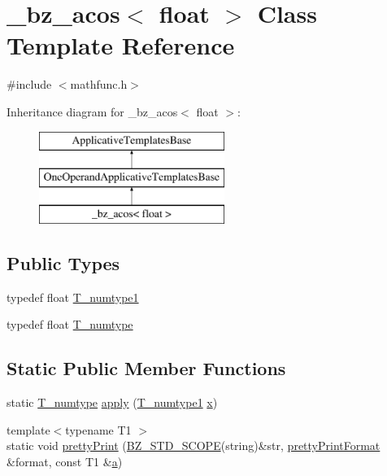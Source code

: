 \hypertarget{class__bz__acos_3_01float_01_4}{}\section{\+\_\+bz\+\_\+acos$<$ float $>$ Class Template Reference}
\label{class__bz__acos_3_01float_01_4}


{\ttfamily \#include $<$mathfunc.\+h$>$}

Inheritance diagram for \+\_\+bz\+\_\+acos$<$ float $>$\+:\begin{figure}[H]
\begin{center}
\leavevmode
\includegraphics[height=3.000000cm]{class__bz__acos_3_01float_01_4}
\end{center}
\end{figure}
\subsection*{Public Types}
\begin{DoxyCompactItemize}
\item 
typedef float \hyperlink{class__bz__acos_3_01float_01_4_a32652281eb3f344d887f72285476cb4c}{T\+\_\+numtype1}
\item 
typedef float \hyperlink{class__bz__acos_3_01float_01_4_a02fb93617593fc2b4ffd6c8709a58d5b}{T\+\_\+numtype}
\end{DoxyCompactItemize}
\subsection*{Static Public Member Functions}
\begin{DoxyCompactItemize}
\item 
static \hyperlink{class__bz__acos_3_01float_01_4_a02fb93617593fc2b4ffd6c8709a58d5b}{T\+\_\+numtype} \hyperlink{class__bz__acos_3_01float_01_4_a3d284d0239c8b887e993ffb492dcd47f}{apply} (\hyperlink{class__bz__acos_3_01float_01_4_a32652281eb3f344d887f72285476cb4c}{T\+\_\+numtype1} \hyperlink{vecnorm1_8cc_ac73eed9e41ec09d58f112f06c2d6cb63}{x})
\item 
{\footnotesize template$<$typename T1 $>$ }\\static void \hyperlink{class__bz__acos_3_01float_01_4_a48ced58c0739cbfc95c7011e733dfd7b}{pretty\+Print} (\hyperlink{numinquire_8h_a2b24ffc3b4ef9803956bc7715c6c7b83}{B\+Z\+\_\+\+S\+T\+D\+\_\+\+S\+C\+O\+P\+E}(string)\&str, \hyperlink{classprettyPrintFormat}{pretty\+Print\+Format} \&format, const T1 \&\hyperlink{gen__mat5files_8m_aae328bf20413f220e38aec4d95bfd6da}{a})
\end{DoxyCompactItemize}


